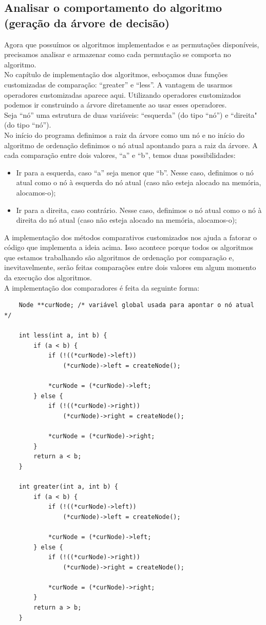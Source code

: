 \documentclass[12pt,a4paper]{article}
\begin{document}
	\subsection{Analisar o comportamento do algoritmo (geração da árvore de decisão)}
	\indent Agora que possuímos os algoritmos implementados e as permutações disponíveis, precisamos analisar e armazenar como cada permutação se comporta no algoritmo.\\
	\indent No capítulo de implementação dos algoritmos, esboçamos duas funções customizadas de comparação: “greater” e “less”. A vantagem de usarmos operadores customizadas aparece aqui. Utilizando operadores customizados podemos ir construindo a árvore diretamente ao usar esses operadores.\\
	\indent Seja “nó” uma estrutura de duas variáveis: “esquerda” (do tipo “nó”) e “direita" (do tipo “nó”).\\
	\indent No início do programa definimos a raiz da árvore como um nó e no início do algoritmo de ordenação definimos o nó atual apontando para a raiz da árvore. A cada comparação entre dois valores, “a” e “b”, temos duas possibilidades:
	\begin{itemize}
		\item Ir para a esquerda, caso “a” seja menor que “b”. Nesse caso, definimos o nó atual como o nó à esquerda do nó atual (caso não esteja alocado na memória, alocamos-o);
		\item Ir para a direita, caso contrário. Nesse caso, definimos o nó atual como o nó à direita do nó atual (caso não esteja alocado na memória, alocamos-o);
	\end{itemize}
	\indent A implementação dos métodos comparativos customizados nos ajuda a fatorar o código que implementa a ideia acima. Isso acontece porque todos os algoritmos que estamos trabalhando são algoritmos de ordenação por comparação e, inevitavelmente, serão feitas comparações entre dois valores em algum momento da execução dos algoritmos.\\
	\indent A implementação dos comparadores é feita da seguinte forma:\\
	\begin{minipage}{\linewidth}
	\begin{lstlisting}
	Node **curNode; /* variável global usada para apontar o nó atual */

	int less(int a, int b) {
		if (a < b) {
			if (!((*curNode)->left))
				(*curNode)->left = createNode();
			
			*curNode = (*curNode)->left;
		} else {
			if (!((*curNode)->right))
				(*curNode)->right = createNode();
			
			*curNode = (*curNode)->right;
		}
		return a < b;
	}

	int greater(int a, int b) {
		if (a < b) {
			if (!((*curNode)->left))
				(*curNode)->left = createNode();

			*curNode = (*curNode)->left;
		} else {
			if (!((*curNode)->right))
				(*curNode)->right = createNode();
			
			*curNode = (*curNode)->right;
		}
		return a > b;
	}
	\end{lstlisting}
	\end{minipage}
\end{document}
